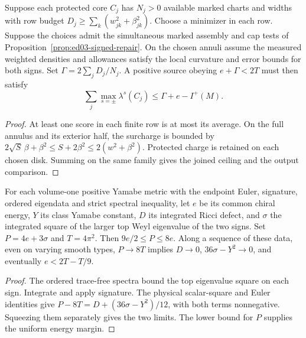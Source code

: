 \begin{proposition}
\label{prop:ed03-measured-choices}
\leanok
Suppose each protected core $C_j$ has $N_j>0$ available marked
charts and widths with row budget $D_j\ge\sum_k(w_{jk}^2+\beta_{jk}^2)$.
Choose a minimizer in each row. Suppose the choices admit the
simultaneous marked assembly and cap tests of
Proposition~\ref{prop:ed03-signed-repair}. On the chosen annuli
assume the measured weighted densities and allowances satisfy the
local curvature and error bounds for both signs. Set
$\Gamma=2\sum_j D_j/N_j$. A positive source obeying
$e+\Gamma<2T$ must then satisfy
\[
 \sum_j\max_{s=\pm}\lambda^s(C_j)\le \Gamma+e-I^+(M).
\]
\end{proposition}
\begin{proof}
\leanok
At least one score in each finite row is at most its average.
On the full annulus and its exterior half, the surcharge is bounded
by $2\sqrt{S}\,\beta+\beta^2\le S+2\beta^2\le2(w^2+\beta^2)$.
Protected charge is retained on each chosen disk. Summing on the
same family gives the joined ceiling and the output comparison.
\end{proof}

\begin{proposition}
\label{prop:ed03-isotropic-entry}
\leanok
For each volume-one positive Yamabe metric with the endpoint Euler,
signature, ordered eigendata and strict spectral inequality, let $e$
be its common chiral energy, $Y$
its class Yamabe constant, $D$ its integrated Ricci defect, and
$\sigma$ the integrated square of the larger top Weyl eigenvalue of
the two signs. Set $P=4e+3\sigma$ and $T=4\pi^2$. Then
$9e/2\le P\le8e$. Along a sequence of these data, even on varying
smooth types, $P\to8T$ implies $D\to0$,
$36\sigma-Y^2\to0$, and eventually $e<2T-T/9$.
\end{proposition}
\begin{proof}
\leanok
The ordered trace-free spectra bound the top eigenvalue square on
each sign. Integrate and apply signature. The physical scalar-square
and Euler identities give $P-8T=D+(36\sigma-Y^2)/12$, with both
terms nonnegative. Squeezing them separately gives the two limits.
The lower bound for $P$ supplies the uniform energy margin.
\end{proof}
